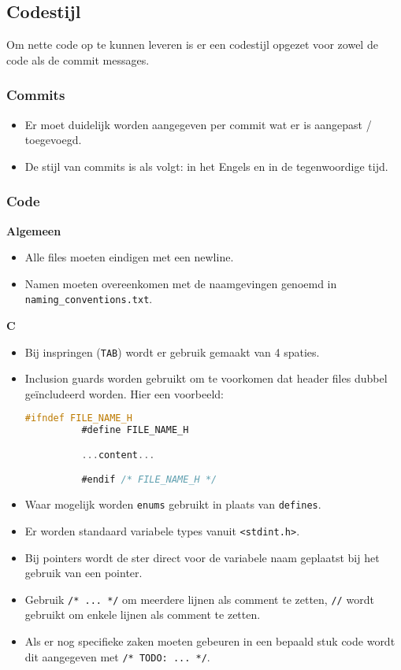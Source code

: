 \subsection{Codestijl}
Om nette code op te kunnen leveren is er een codestijl opgezet voor zowel
de code als de commit messages.

\subsubsection{Commits}
\begin{itemize}
    \item Er moet duidelijk worden aangegeven per commit wat er is aangepast /
          toegevoegd.
    \item De stijl van commits is als volgt: in het Engels en in de tegenwoordige
          tijd.
\end{itemize}

\subsubsection{Code}
\textbf{Algemeen}

\begin{itemize}
  \item Alle files moeten eindigen met een newline.
  \item Namen moeten overeenkomen met de naamgevingen genoemd in
      \texttt{naming\_conventions.txt}.
\end{itemize}

\textbf{C}
\begin{itemize}
  \item Bij inspringen (\texttt{TAB}) wordt er gebruik gemaakt van 4 spaties.
  \item Inclusion guards worden gebruikt om te voorkomen dat header files dubbel
        geïncludeerd worden. Hier een voorbeeld:
        \begin{lstlisting}[language=C,frame=single]
          #ifndef FILE_NAME_H
          #define FILE_NAME_H

          ...content...

          #endif /* FILE_NAME_H */
        \end{lstlisting}
  \item Waar mogelijk worden \texttt{enums} gebruikt in plaats van \texttt{defines}.
  \item Er worden standaard variabele types vanuit \texttt{<stdint.h>}.
  \item Bij pointers wordt de ster direct voor de variabele naam geplaatst
        bij het gebruik van een pointer.
  \item Gebruik \texttt{/* ... */} om meerdere lijnen als comment te zetten,
        \texttt{//} wordt gebruikt om enkele lijnen als comment te zetten.
  \item Als er nog specifieke zaken moeten gebeuren in een bepaald stuk code wordt
        dit aangegeven met \texttt{/* TODO: ... */}.
\end{itemize}
